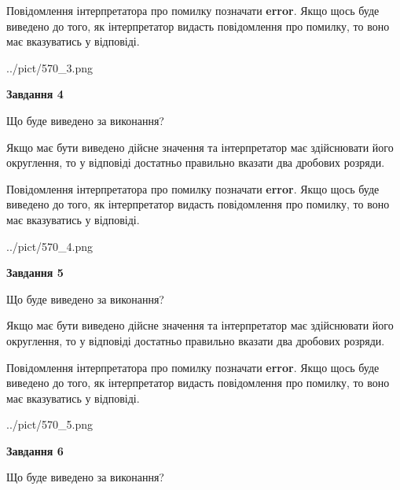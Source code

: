 \documentclass[12pt, ukrainian]{article}
\begin{document}
{\begin {Large}
Повідомлення інтерпретатора про помилку позначати \textbf{error}.
Якщо щось буде виведено до того, як інтерпретатор видасть повідомлення про помилку, 
то воно має вказуватись у відповіді. \par

\begin{center}
	{../pict/570_3.png}
\end{center}
\newpage

{\begin {center}\textbf{Завдання 4}\end {center}}\par
Що буде виведено за виконання? \par

Якщо має бути виведено дійсне значення та інтерпретатор має здійснювати його округлення, 
то у відповіді достатньо правильно вказати два дробових розряди.

Повідомлення інтерпретатора про помилку позначати \textbf{error}.
Якщо щось буде виведено до того, як інтерпретатор видасть повідомлення про помилку, 
то воно має вказуватись у відповіді. \par

\begin{center}
	{../pict/570_4.png}
\end{center}
\newpage

{\begin {center}\textbf{Завдання 5}\end {center}}\par
Що буде виведено за виконання? \par

Якщо має бути виведено дійсне значення та інтерпретатор має здійснювати його округлення, 
то у відповіді достатньо правильно вказати два дробових розряди.

Повідомлення інтерпретатора про помилку позначати \textbf{error}.
Якщо щось буде виведено до того, як інтерпретатор видасть повідомлення про помилку, 
то воно має вказуватись у відповіді. \par

\begin{center}
	{../pict/570_5.png}
\end{center}
\newpage

{\begin {center}\textbf{Завдання 6}\end {center}}\par
Що буде виведено за виконання? \par


\end{Large}}
\end{document}
